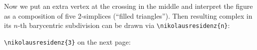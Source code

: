 \documentclass{tixtex}
\makeatletter
\newcommand{\subdivrec}[4]{
    \ifnum#4 < 1 %
        
        \draw [Dshapefillgray,Dline] (#1)--(#2)--(#3)--cycle;
    
        \foreach \@c in {#1,#2,#3}
            \path (\@c) node [Dpoint] {};
        
    \else %
        
        \path
            (barycentric cs:#1=1,#2=1) coordinate (m3r#4)
            (barycentric cs:#2=1,#3=1) coordinate (m1r#4)
            (barycentric cs:#1=1,#3=1) coordinate (m2r#4)
            (barycentric cs:#1=1,#2=1,#3=1) coordinate (mMr#4);
        
        \begingroup
        \pgfmathtruncatemacro{\@reclevel}{#4-1} %
        \foreach \@cA/\@cB/\@cC in
                {#1/m2r#4/mMr#4,   #1/m3r#4/mMr#4,
                 #2/m1r#4/mMr#4,   #2/m3r#4/mMr#4,
                 #3/m1r#4/mMr#4,   #3/m2r#4/mMr#4}
            \edef\zz{\noexpand\subdivrec{\@cA}{\@cB}{\@cC}{\@reclevel}}\zz;
        \endgroup
    \fi
}
\newcommand{\nikolausresidenz}[1]{
    \begingroup
    
    \newcommand{\xx}{14}
    \newcommand{\yy}{14}
    \newcommand{\xxh}{7}
    \newcommand{\yyh}{7}
    \newcommand{\yyt}{21}
    
    \path
        (0,0)       coordinate (Nld)
        (\xx,0)     coordinate (Nrd)
        (\xx,\yy)   coordinate (Nru)
        (0,\yy)     coordinate (Nlu)
        (\xxh,\yyh) coordinate (Nm)
        (\xxh,\yyt) coordinate (Nt)
    ;
        
    \foreach \cA/\cB/\cC in 
            {Nld/Nrd/Nm,    Nld/Nlu/Nm,
             Nrd/Nru/Nm,    Nru/Nlu/Nm,
             Nlu/Nru/Nt}
        \subdivrec{\cA}{\cB}{\cC}{#1};
        
    \endgroup
}
\makeatother
\begin{document}
Now we put an extra vertex at the crossing in the middle and interpret the
figure as a composition of five 2-simplices (``filled triangles'').
Then resulting complex in its $n$-th barycentric subdivision can be drawn
via \verb|\nikolausresidenz{n}|:
\begin{center}
\end{center}

\bigskip
\verb|\nikolausresidenz{3}| on the next page:

\newpage\enlargethispage{2cm}
\begin{center}
\end{center}
\end{document}
